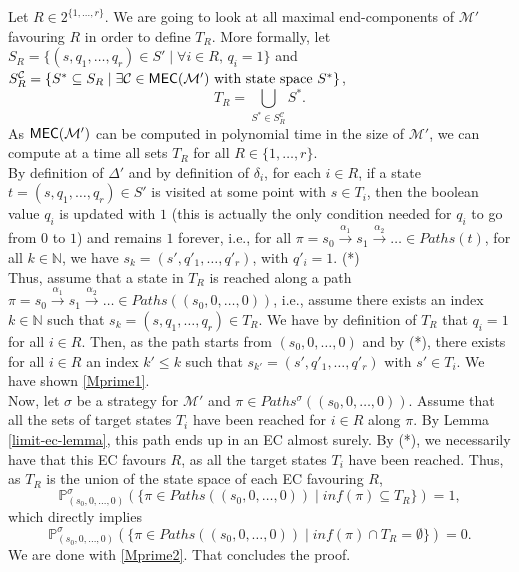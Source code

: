 \begin{proof2}
  Let $R \in 2^{\{1, \dots, r\}}$.
  We are going to look at all maximal end-components of $\mathcal{M}'$ favouring $R$ in order to define $T_R$.
  More formally, let $S_R = \{ (s, q_1, \dots, q_r) \in S' \; | \; \forall i \in R, \, q_i = 1 \}$ and $S^{\mathcal{C}}_R = \{ S^* \subseteq S_R \; | \; \exists \mathcal{C} \in \textnormal{\sffamily MEC}(\mathcal{M'}) \text{ with state space } S^* \}$,
  \[
    T_R = \bigcup_{S^* \in S_R^\mathcal{C}} S^*.
  \]
  As $\textnormal{\sffamily MEC}(\mathcal{M'})$ can be computed in polynomial time in the size of $\mathcal{M'}$, we can compute at a time all sets $T_R$ for all $R \in \{1, \dots, r\}$.
  \\
  By definition of $\Delta'$ and by definition of $\delta_i$, for each $i \in R$, if a state $t=(s, q_1, \dots, q_r) \in S'$ is visited at some point with $s \in T_i$, then the boolean value $q_i$ is updated with $1$ (this is actually the only condition needed for $q_i$ to go from $0$ to $1$) and remains $1$ forever, i.e., for all
  $\pi=s_0 \xrightarrow{\alpha_1} s_1 \xrightarrow{\alpha_2}\dots \in Paths(t)$, for all $k \in \mathbb{N}$,
  we have $s_k = (s', q'_1, \dots, q'_r)$, with $q'_i =1$. {\color{umons-red}(*)} \\
  Thus, assume that a state in $T_R$ is reached along a path $\pi=s_0 \xrightarrow{\alpha_1} s_1 \xrightarrow{\alpha_2}\dots \in Paths((s_0, 0, \dots, 0))$, i.e., assume there exists an index $k \in \mathbb{N}$ such that $s_k = (s, q_1, \dots, q_r) \in T_R$. We have by definition of $T_R$ that $q_i = 1$ for all $i \in R$.
  Then, as the path starts from $(s_0, 0, \dots, 0)$ and by {\color{umons-red}(*)}, there exists for all $i \in R$ an index $k' \leq k$ such that $s_{k'} = (s', q'_1, \dots, q'_r)$
  with $s' \in T_i$. We have shown \ref{Mprime1}.\\
  Now, let $\sigma$ be a strategy for $\mathcal{M}'$ and $\pi %
  \in Paths^\sigma((s_0, 0, \dots, 0))$.
  Assume that all the sets of target states $T_i$ have been reached for $i \in R$ along $\pi$.
  By Lemma \ref{limit-ec-lemma}, this path ends up in an EC almost surely. By {\color{umons-red}(*)}, we necessarily have that this EC favours $R$, as all the target states $T_i$ have been reached. Thus, as $T_R$ is the union of the state space of each EC favouring $R$,
  \[
    \mathbb{P}^\sigma_{(s_0, 0, \dots, 0)}(\{ \pi \in Paths((s_0, 0, \dots, 0)) \; | \; inf(\pi) \subseteq T_R \}) = 1,
  \]
  which directly implies
  \[
    \mathbb{P}^\sigma_{(s_0, 0, \dots, 0)}(\{ \pi \in Paths((s_0, 0, \dots, 0)) \; | \; inf(\pi) \cap T_R = \emptyset \}) = 0.
  \]
  We are done with \ref{Mprime2}. That concludes the proof.
  \end{proof2}
